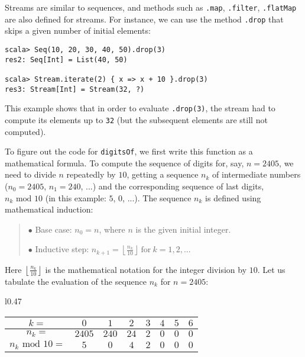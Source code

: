 Streams are similar to sequences, and methods such as \lstinline!.map!,
\lstinline!.filter!, \lstinline!.flatMap! are also defined for streams.
For instance, we can use the method \lstinline!.drop! that skips
a given number of initial elements:
\begin{lstlisting}
scala> Seq(10, 20, 30, 40, 50).drop(3)
res2: Seq[Int] = List(40, 50)

scala> Stream.iterate(2) { x => x + 10 }.drop(3)
res3: Stream[Int] = Stream(32, ?)
\end{lstlisting}
This example shows that in order to evaluate \lstinline!.drop(3)!,
the stream had to compute its elements up to \lstinline!32! (but
the subsequent elements are still not computed).

To figure out the code for \lstinline!digitsOf!, we first write this
function as a mathematical formula. To compute the sequence of digits
for, say, $n=2405$, we need to divide $n$ repeatedly by $10$, getting
a sequence $n_{k}$ of intermediate numbers ($n_{0}=2405$, $n_{1}=240$,
...) and the corresponding sequence of last digits, $n_{k}\text{ mod }10$
(in this example: $5$, $0$, ...). The sequence $n_{k}$ is defined
using mathematical induction:
\begin{quotation}
$\bullet$ Base case: $n_{0}=n$, where $n$ is the given initial
integer.

$\bullet$ Inductive step: $n_{k+1}=\left\lfloor \frac{n_{k}}{10}\right\rfloor \ \text{for}\ k=1,2,...$
\end{quotation}
Here $\left\lfloor \frac{n_{k}}{10}\right\rfloor $ is the mathematical
notation for the integer division by $10$. Let us tabulate the evaluation
of the sequence $n_{k}$ for $n=2405$: 

\begin{wraptable}{l}{0.47\columnwidth}%
\begin{centering}
\vspace{-0.75\baselineskip}
\begin{tabular}{|c|c|c|c|c|c|c|c|}
\hline 
{\small{}$k=$} & {\small{}$0$} & {\small{}$1$} & {\small{}$2$} & {\small{}$3$} & {\small{}$4$} & {\small{}$5$} & {\small{}$6$}\tabularnewline
\hline 
{\small{}$n_{k}=$} & {\small{}$2405$} & {\small{}$240$} & {\small{}$24$} & {\small{}$2$} & {\small{}$0$} & {\small{}$0$} & {\small{}$0$}\tabularnewline
\hline 
{\small{}$n_{k}\text{ mod }10=$} & {\small{}$5$} & {\small{}$0$} & {\small{}$4$} & {\small{}$2$} & {\small{}$0$} & {\small{}$0$} & {\small{}$0$}\tabularnewline
\hline 
\end{tabular}
\par\end{centering}
\vspace{-1\baselineskip}
\end{wraptable}%

